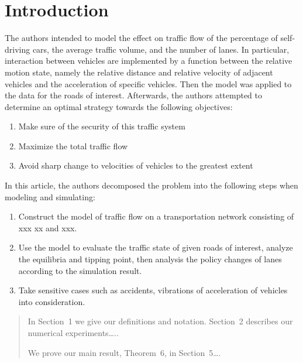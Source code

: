 \documentclass{icmmcm}
\begin{document}


\maketitle
\tableofcontents

 

\section{Introduction}%
\label{sec:introduction}

The authors intended to model the effect on traffic flow of the percentage of self-driving cars, the average traffic volume, and the number of lanes. In particular, interaction between vehicles are implemented by a function between the relative motion state, namely the relative distance and relative velocity of adjacent vehicles and the acceleration of specific vehicles. Then the model was applied to the data for the roads of interest. Afterwards, the authors attempted to determine an optimal strategy towards the following objectives:

\begin{enumerate}
\item Make sure of the security of this traffic system
\item Maximize the total traffic flow 
\item Avoid sharp change to velocities of vehicles to the greatest extent
\end{enumerate}
In this article, the authors decomposed the problem into the following steps when modeling and simulating:
\begin{enumerate}
\item Construct the model of traffic flow on a transportation network consisting of xxx xx and xxx.
\item Use the model to  evaluate the traffic state of given roads of interest, analyze the equilibria and tipping point, then analysis the policy changes of lanes according to the simulation result.
\item Take sensitive cases such as accidents, vibrations of acceleration of vehicles into consideration.
\end{enumerate}
\begin{quotation}
  In Section~1 we give our definitions and notation. Section~2
  describes our numerical experiments\ldots{}..
  
  We prove our main result, Theorem~6, in Section~5\ldots{}.
\end{quotation}
\end{document}
